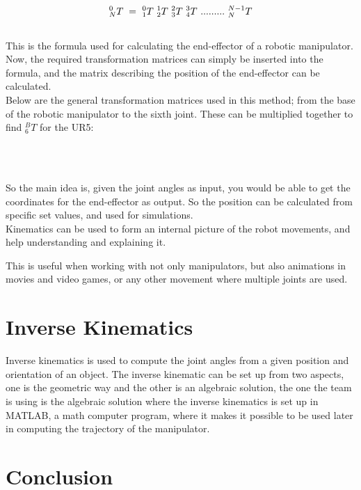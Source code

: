 \begin{equation}
    _N^0 T\; =\ _1^0T\  _2^1T\  _3^2T\  _4^3T\  .........\  _N^{N-1}T\\
\end{equation} \\

This is the formula used for calculating the end-effector of a robotic manipulator. \\

Now, the required transformation matrices can simply be inserted into the formula, and the matrix describing the position of the end-effector can be calculated. \\

Below are the general transformation matrices used in this method; from the base of the robotic manipulator to the sixth joint. These can be multiplied together to find \(_6^BT\) for the UR5: 

 \\\


So the main idea is, given the joint angles as input, you would be able to get the coordinates for the end-effector as output. So the position can be calculated from specific set values, and used for simulations.  \\

Kinematics can be used to form an internal picture of the robot movements, and help understanding and explaining it. 

This is useful when working with not only manipulators, but also animations in movies and video games, or any other movement where multiple joints are used. 



\section{Inverse Kinematics}
Inverse kinematics is used to compute the joint angles from a given position and orientation of an object\cite{JohnC}. The inverse kinematic can be set up from two aspects, one is the geometric way and the other is an algebraic solution, the one the team is using is the algebraic solution where the inverse kinematics is set up in MATLAB, a math computer program, where it makes it possible to be used later in computing the trajectory of the manipulator.\\




\section{Conclusion} 

